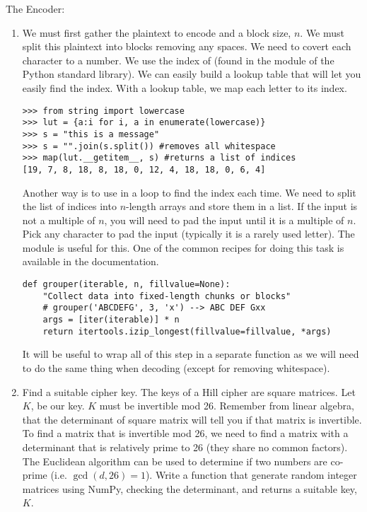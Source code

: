 \begin{problem}
The Encoder:
\begin{enumerate}
\item We must first gather the plaintext to encode and a block size, $n$.  
We must split this plaintext into blocks removing any spaces.  We need to covert each character to a number.
We use the index of  (found in the  module of the Python standard library).
We can easily build a lookup table that will let you easily find the index.
With a lookup table, we map each letter to its index.
\begin{lstlisting}
>>> from string import lowercase
>>> lut = {a:i for i, a in enumerate(lowercase)}
>>> s = "this is a message"
>>> s = "".join(s.split()) #removes all whitespace
>>> map(lut.__getitem__, s) #returns a list of indices
[19, 7, 8, 18, 8, 18, 0, 12, 4, 18, 18, 0, 6, 4]
\end{lstlisting}
Another way is to use  in a loop to find the index each time.
We need to split the list of indices into $n$-length arrays and store them in a list.
If the input is not a multiple of $n$, you will need to pad the input until it is a multiple of $n$.
Pick any character to pad the input (typically it is a rarely used letter).
The  module is useful for this.  One of the common recipes for doing this task is available in the  documentation.  
\begin{lstlisting}
def grouper(iterable, n, fillvalue=None):
    "Collect data into fixed-length chunks or blocks"
    # grouper('ABCDEFG', 3, 'x') --> ABC DEF Gxx
    args = [iter(iterable)] * n
    return itertools.izip_longest(fillvalue=fillvalue, *args)
\end{lstlisting}
It will be useful to wrap all of this step in a separate function as we will need to do the same thing when decoding (except for removing whitespace).

\item Find a suitable cipher key.  The keys of a Hill cipher are square matrices.  Let $K$, be our key.
$K$ must be invertible mod 26.  
Remember from linear algebra, that the determinant of square matrix will tell you if that matrix is invertible.
To find a matrix that is invertible mod 26, we need to find a matrix with a determinant that is relatively prime to 26 (they share no common factors).
The Euclidean algorithm can be used to determine if two numbers are co-prime (i.e. $\gcd(d, 26) = 1$).
Write a function that generate random integer matrices using NumPy, checking the determinant, and returns a suitable key, $K$.


\end{enumerate}
\end{problem}
